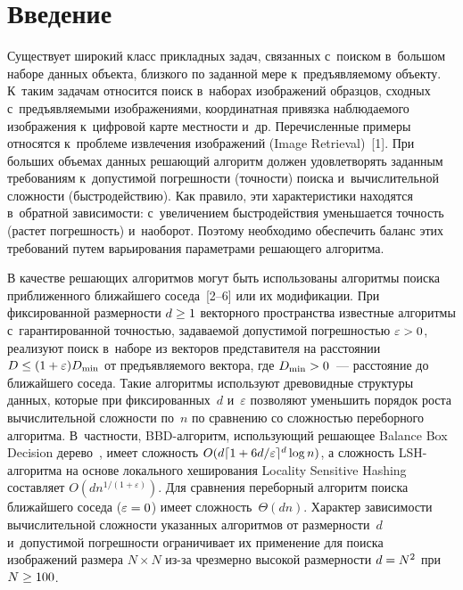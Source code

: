 
\vspace*{4pt}



\thispagestyle{headings}

\begin{multicols}{2}

\label{st\stat}

\section{Введение}

\vspace*{-4pt}

  Существует широкий класс прикладных задач, связанных с~поиском 
в~большом наборе данных объекта, близкого по заданной мере 
к~предъявляемому объекту. К~таким задачам относится поиск в~наборах 
изображений образцов, сходных с~предъявляемыми изображениями, 
координатная привязка наблюдаемого изображения к~цифровой карте 
местности и~др. Перечисленные примеры относятся к~проблеме извлечения 
изображений (Image Retrieval)~[1]. При больших объемах данных решающий 
алгоритм должен удовлетворять заданным требованиям к~допустимой 
по\-греш\-ности (точ\-ности) поиска и~вычислительной слож\-ности 
(быст\-ро\-дей\-ст\-вию). Как правило, эти характеристики находятся в~обратной 
зависимости: с~увеличением быст\-ро\-дей\-ст\-вия уменьшается точ\-ность (растет 
по\-греш\-ность) и~наоборот. Поэтому необходимо обеспечить баланс этих 
требований путем варьирования па\-ра\-мет\-ра\-ми решающего алгоритма.
  
  В качестве решающих алгоритмов могут быть использованы алгоритмы 
поиска приближенного ближайшего соседа~[2--6] или их модификации. При 
фиксированной размерности $d\hm\geq 1$ векторного пространства известные 
алгоритмы с~гарантированной точностью, задаваемой допустимой 
погрешностью $\varepsilon\hm>0$, реализуют поиск в~наборе из   векторов 
представителя на расстоянии $D\hm\leq (1\hm+\varepsilon)D_{\min}$ от 
предъявляемого вектора, где $D_{\min}\hm>0$~--- расстояние до ближайшего 
соседа. Такие алгоритмы используют древовидные структуры данных, которые 
при фиксированных~$d$ и~$\varepsilon$ позволяют уменьшить порядок роста 
вычислительной сложности по~$n$ по сравнению со сложностью переборного 
алгоритма. В~частности, BBD-ал\-го\-ритм, использующий решающее Balance 
Box Decision дерево~\cite{5-lan}, имеет сложность $O(d\lceil 
1\hm+6d/\varepsilon\rceil^d\log n)$, а сложность LSH-ал\-го\-рит\-ма на основе 
локального хеширования Locality Sensitive Hashing~\cite{6-lan} составляет 
$O(dn^{1/(1+\varepsilon)})$. Для сравнения переборный алгоритм поиска 
ближайшего соседа ($\varepsilon\hm=0$) имеет сложность~$\Theta(dn)$. 
Характер зависимости вычислительной сложности указанных алгоритмов от 
размерности~$d$ и~допустимой погрешности   ограничивает их применение 
для поиска изображений размера $N\times N$ из-за чрезмерно высокой 
размерности $d\hm=N^2$ при $N\hm\geq 100$. 
  

\end{multicols}
